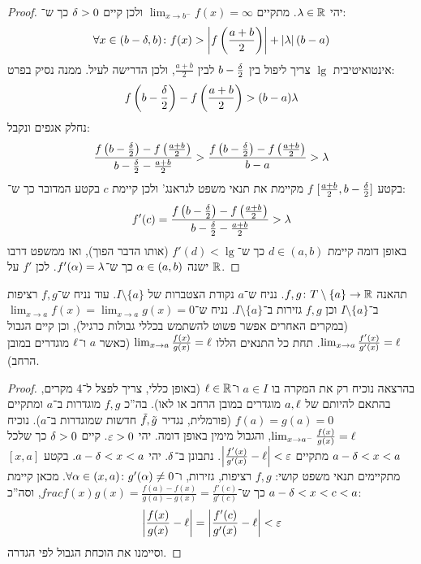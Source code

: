 \documentclass[name=רשימות חשבון דיפרנציאלי ואינטגרלי 1א]{../../../tex/classes/megasumPreamble}
\begin{document}
	\begin{proof}
		יהי $\lambda \in \mathbb{R}$. מתקיים $\lim_{x \to b^{-}} f(x) = \infty$ ולכן קיים $\delta > 0$ כך ש־:
		\[ \forall x \in (b - \delta, b) \colon f(x) > \left \lvert f\left ( \frac{a + b}{2} \right ) \right \rvert + \left \lvert \lambda \right \rvert(b - a) \]
		אינטואיטיבית $\lg$ צריך ליפול בין $b - \frac{\delta}{2}$ לבין $\frac{a + b}{2}$, ולכן הדרישה לעיל. ממנה נסיק בפרט:
		\[ f\left ( b - \frac{\delta}{2} \right ) - f\left ( \frac{a + b}{2} \right ) > (b - a) \lambda \]
		נחלק אגפים ונקבל:
		\[ \frac{f\left ( b -\frac{\delta}{2} \right ) - f\left ( \frac{a + b}{2} \right )}{b - \frac{\delta}{2} - \frac{a + b}{2}} > \frac{f\left ( b -\frac{\delta}{2} \right ) - f\left ( \frac{a + b}{2} \right )}{b- a} > \lambda \]
		בקטע $[\frac{a + b}{2}, b - \frac{\delta}{2}]$ $f$ מקיימת את תנאי משפט לגראנג' ולכן קיימת $c$ בקטע המדובר כך ש־:
		\[ f'(c) = \frac{f\left ( b - \frac{\delta}{2} \right ) - f\left ( \frac{a +b}{2} \right )}{b - \frac{\delta}{2} - \frac{a + b}{2}} > \lambda \]
		באופן דומה קיימת $d \in (a, b)$ כך ש־$f'(d) < \lg$ (אותו הדבר הפוך), ואז ממשפט דרבו ישנה $\alpha \in (a, b)$ כך ש־$f'(\alpha) = \lambda$. לכן $f'$ על $\mathbb{R}$.
	\end{proof}

	\begin{Theorem}
		תהאנה $f, g \colon T \setminus \{a\} \to \mathbb{R}$. נניח ש־$a$ נקודת הצטברות של $I \setminus \{a\}$. עוד נניח ש־$f, g$ רציפות ב־$I \setminus \{a\}$ וכן $f, g$ גזירות ב־$I \setminus \{a\}$. נניח ש־$\lim_{x \to a} f(x) = \lim_{x \to a} g(x) = 0$ (במקרים האחרים אפשר פשוט להשתמש בכללי גבולות כרגיל), וכן קיים הגבול $\lim_{x \to a} \frac{f'(x)}{g'(x)}  = \ell$. תחת כל התנאים הללו $\lim_{x \to a}\frac{f(x)}{g(x)} = \ell$ (כאשר $a$ ו־$\ell$ מוגדרים במובן הרחב).
	\end{Theorem}


	\begin{proof}
		בהרצאה נוכיח רק את המקרה בו $a \in I$ ו־$\ell \in \mathbb{R}$ (באופן כללי, צריך לפצל ל־4 מקרים, בהתאם להיותם של $a, \ell$ מוגדרים במובן הרחב או לאו). בה''כ $f, g$ מוגדרות ב־$a$ ומתקיים $f(a) = g(a) = 0$ (פורמלית, נגדיר $\tilde f, \tilde g$ חדשות שמוגדרות ב־$a$). נוכיח $\lim_{x \to a^{-}} \frac{f(x)}{g(x)} = \ell$, והגבול מימין באופן דומה. יהי $\eg > 0$. קיים $\delta > 0$ כך שלכל $a - \delta < x < a$ מתקיים $\sof{\frac{f'(x)}{g'(x)} - \ml} < \eg$. נתבונן ב־$\delta$. יהי $a - \delta < x < a$. בקטע $[x, a]$ מתקיימים תנאי משפט קושי: $f, g$ רציפות, גזירות, ו־$\forall \alpha \in (x, a) \colon g'(\alpha) \neq 0$. מכאן קיימת $a - \delta < x < c < a$ כך ש־$frac{f(x)}{g(x)} = \frac{f(a) - f(x)}{g(a) - g(x)} = \frac{f'(c)}{g'(c)} $, וסה''כ:
		\[ \sof{\frac{f(x)}{g(x)} - \ml} = \sof{\frac{f'(c)}{g'(x)} - \ml} < \eg \]
		וסיימנו את הוכחת הגבול לפי הגדרה.
	\end{proof}
\end{document}

